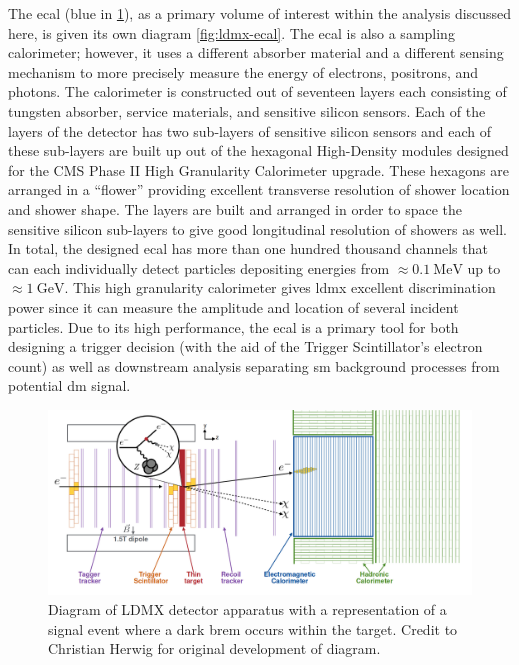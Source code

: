 The \ac{ecal} (blue in \cref{fig:ldmx-det}), as a primary volume of interest within the analysis
discussed here, is given its own diagram \cref{fig:ldmx-ecal}. The \ac{ecal} is also a sampling
calorimeter; however, it uses a different absorber material and a different sensing mechanism to
more precisely measure the energy of electrons, positrons, and photons. The calorimeter is
constructed out of seventeen layers each consisting of tungsten absorber, service materials, and
sensitive silicon sensors. Each of the layers of the detector has two sub-layers of sensitive
silicon sensors and each of these sub-layers are built up out of the hexagonal High-Density modules
designed for the CMS Phase II High Granularity Calorimeter upgrade\cite{cms-phase-2-tdr}. These
hexagons are arranged in a ``flower'' providing excellent transverse resolution of shower location
and shower shape. The layers are built and arranged in order to space the sensitive silicon
sub-layers to give good longitudinal resolution of showers as well. In total, the designed
\ac{ecal} has more than one hundred thousand channels that can each individually detect particles
depositing energies from $\approx \qty{0.1}{\mega\electronvolt}$ up to
$\approx\qty{1}{\giga\electronvolt}$.
This high granularity calorimeter gives \ac{ldmx} excellent discrimination power since it can
measure the amplitude and location of several incident particles.
Due to its high performance, the \ac{ecal} is a primary tool for both
designing a trigger decision (with the aid of the Trigger Scintillator's electron count) as well as
downstream analysis separating \ac{sm} background processes from potential \ac{dm} signal.

\begin{figure}
  \centering
  \includegraphics[width=\textwidth]{figures/ldmx/experiment/detector.png}
  \caption{
    Diagram of LDMX detector apparatus with a representation of a signal event where
    a dark brem occurs within the target. Credit to Christian Herwig
    for original development of diagram.
  }
  \label{fig:ldmx-det}
\end{figure}

